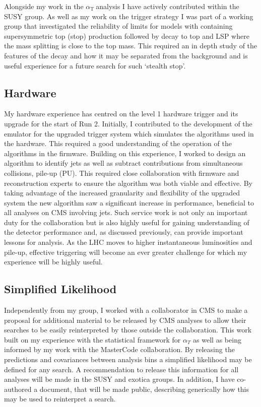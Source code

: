 \documentclass[11pt]{article}
\theoremstyle{plain} \numberwithin{equation}{section}
\theoremstyle{definition}
\DeclareRobustCommand{\alphat}{$\alpha_{\text{T}}~$}
\begin{document}
Alongside my work in the \alphat analysis I have actively contributed within the SUSY group.
As well as my work on the trigger strategy I was part of a working group that investigated
the reliability of limits for models with containing supersymmetric top (stop) production followed by decay 
to top and LSP where the mass splitting is close to the top mass. This required an in depth study of the features of the decay and how it 
may be separated from the background and is useful experience for a future search for such `stealth stop'.

\subsection*{Hardware}
My hardware experience has centred on the level 1 hardware trigger and its
upgrade for the start of Run 2. Initially, I contributed to the development of the emulator for the upgraded
trigger system which simulates the algorithms used in the hardware. This required a good understanding
of the operation of the algorithms in the firmware. Building on this experience, 
I worked to design an algorithm to identify jets as well as subtract contributions from simultaneous collisions, 
pile-up (PU). This required close collaboration with firmware and reconstruction experts to ensure the algorithm was 
both viable and effective. By taking advantage of the increased granularity and flexibility of the 
upgraded system the new algorithm saw a significant increase in performance, beneficial
to all analyses on CMS involving jets. Such service work is not only an important duty for the collaboration but is also
highly useful for gaining understanding of the detector performance and, as discussed previously,
can provide important lessons for analysis. As the LHC moves to higher instantaneous 
luminosities and pile-up, effective triggering will become an ever greater challenge 
for which my experience will be highly useful. 

\subsection*{Simplified Likelihood}
Independently from my group, I worked with a collaborator in CMS to make a proposal 
for additional material to be released by CMS analyses
to allow their searches to be easily reinterpreted by those outside the collaboration. 
This work built on my experience with the statistical framework for $\alpha_T$ as well as being 
informed by my work with the MasterCode collaboration. By releasing the predictions and covariances between analysis bins 
a simplified likelihood may be defined for any search. A recommendation to release this information for all analyses
will be made in the SUSY and exotica groups. In addition, I have co-authored a document,
that will be made public, describing generically how this may be used to reinterpret a search.
\end{document}
